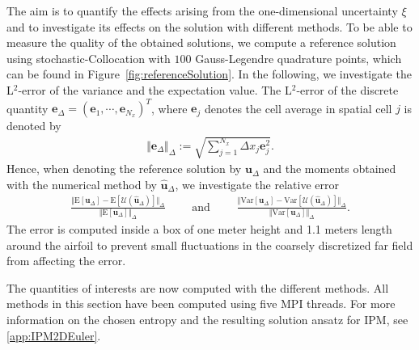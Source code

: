 The aim is to quantify the effects arising from the one-dimensional uncertainty $\xi$ and to investigate its effects on the solution with different methods. To be able to measure the quality of the obtained solutions, we compute a reference solution using stochastic-Collocation with $100$ Gauss-Legendre quadrature points, which can be found in Figure~\ref{fig:referenceSolution}. In the following, we investigate the L$^2$-error of the variance and the expectation value. The L$^2$-error of the discrete quantity $\bm e_{\Delta}=(\bm e_1,\cdots,\bm e_{N_x})^T$, where $\bm e_j$ denotes the cell average in spatial cell $j$ is denoted by
\begin{align*}
\Vert \bm e_{\Delta} \Vert_{\Delta} := \sqrt{\sum_{j=1}^{N_x} \Delta x_j \bm e_j^2}.
\end{align*}
Hence, when denoting the reference solution by $\bm u_{\Delta}$ and the moments obtained with the numerical method by $\hat{\bm u}_{\Delta}$, we investigate the relative error
\begin{align*}
\frac{\Vert \text{E}[\bm u_{\Delta}] - \text{E}[\mathcal{U}(\bm{\hat u}_{\Delta})] \Vert_{\Delta}}{\Vert \text{E}[\bm u_{\Delta}] \Vert_{\Delta}} \qquad \text{ and }\qquad \frac{\Vert \text{Var}[\bm u_{\Delta}] - \text{Var}[\mathcal{U}(\bm{\hat u}_{\Delta})] \Vert_{\Delta}}{\Vert \text{Var}[\bm u_{\Delta}] \Vert_{\Delta}}.
\end{align*}
The error is computed inside a box of one meter height and 1.1 meters length around the airfoil to prevent small fluctuations in the coarsely discretized far field from affecting the error.

The quantities of interests are now computed with the different methods. All methods in this section have been computed using five MPI threads. For more information on the chosen entropy and the resulting solution ansatz for IPM, see \ref{app:IPM2DEuler}. 

